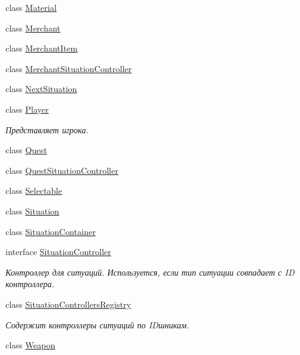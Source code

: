 \begin{DoxyCompactItemize}
class \hyperlink{class_a_s_c_i_i_wars_1_1_game_1_1_material}{Material}
\item 
class \hyperlink{class_a_s_c_i_i_wars_1_1_game_1_1_merchant}{Merchant}
\item 
class \hyperlink{class_a_s_c_i_i_wars_1_1_game_1_1_merchant_item}{Merchant\+Item}
\item 
class \hyperlink{class_a_s_c_i_i_wars_1_1_game_1_1_merchant_situation_controller}{Merchant\+Situation\+Controller}
\item 
class \hyperlink{class_a_s_c_i_i_wars_1_1_game_1_1_next_situation}{Next\+Situation}
\item 
class \hyperlink{class_a_s_c_i_i_wars_1_1_game_1_1_player}{Player}
\begin{DoxyCompactList}\small\item\em Представляет игрока. \end{DoxyCompactList}\item 
class \hyperlink{class_a_s_c_i_i_wars_1_1_game_1_1_quest}{Quest}
\item 
class \hyperlink{class_a_s_c_i_i_wars_1_1_game_1_1_quest_situation_controller}{Quest\+Situation\+Controller}
\item 
class \hyperlink{class_a_s_c_i_i_wars_1_1_game_1_1_selectable}{Selectable}
\item 
class \hyperlink{class_a_s_c_i_i_wars_1_1_game_1_1_situation}{Situation}
\item 
class \hyperlink{class_a_s_c_i_i_wars_1_1_game_1_1_situation_container}{Situation\+Container}
\item 
interface \hyperlink{interface_a_s_c_i_i_wars_1_1_game_1_1_situation_controller}{Situation\+Controller}
\begin{DoxyCompactList}\small\item\em Контроллер для ситуаций. Используется, если тип ситуации совпадает с ID контроллера. \end{DoxyCompactList}\item 
class \hyperlink{class_a_s_c_i_i_wars_1_1_game_1_1_situation_controllers_registry}{Situation\+Controllers\+Registry}
\begin{DoxyCompactList}\small\item\em Содержит контроллеры ситуаций по ID\textquotesingle{}шникам. \end{DoxyCompactList}\item 
class \hyperlink{class_a_s_c_i_i_wars_1_1_game_1_1_weapon}{Weapon}
\end{DoxyCompactItemize}
